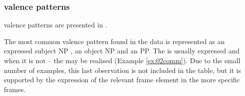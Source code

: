 \documentclass[output=paper,colorlinks,citecolor=brown]{langscibook}
\begin{document}
\subsubsection{ valence patterns}

 valence patterns are presented in .

The most common valence pattern found in the data is represented as an expressed subject NP , an object NP  and an  PP. The  is usually expressed and when it is not -- the  may be realised (Example \ref{ex:02comm}). Due to the small number of examples, this last observation is not included in the table, but it is supported by the expression of the relevant frame element in the more specific frames. 
\end{document}
